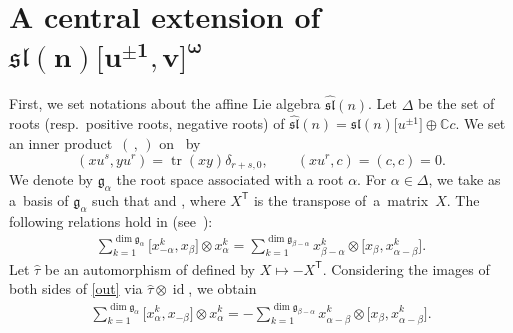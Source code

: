 \documentclass[pdftex]{sigma}
\numberwithin{equation}{section}
\theoremstyle{definition}
\DeclareMathOperator{\id}{id}
\DeclareMathOperator{\tr}{tr}
\begin{document}
\section[A central extension of sl(n){[u\^{}\{pm1\},v]}\^{}omega]{A central extension of $\boldsymbol{\mathfrak{sl}(n)\bigl[u^{\pm1},v\bigr]^\omega}$}\label{sec:3}
First, we set notations about the affine Lie algebra $\widehat{\mathfrak{sl}}(n)$.
Let $\Delta$  be the set of roots (resp.\ positive roots, negative roots) of $\widehat{\mathfrak{sl}}(n)=\mathfrak{sl}(n)\bigl[u^{\pm1}\bigr]\oplus\mathbb{C}c$.
We set an inner product~$(\, ,\, )$ on~ by
\begin{equation*}
(xu^s,yu^r)=\tr(xy)\delta_{r+s,0},\qquad (xu^r,c)=(c,c)=0.
\end{equation*}
We denote by $\mathfrak{g}_\alpha$ the root space associated with a root $\alpha$.
For $\alpha\in\Delta$, we take  as a~basis of $\mathfrak{g}_\alpha$ such that  and , where $X^{\mathsf{T}}$ is the transpose of~a~matrix~$X$.
The following relations hold in  (see~\cite[Corollary 2.4]{K}):
\begin{gather}
\sum_{k=1}^{\dim \mathfrak{g}_\alpha}\bigl[x_{-\alpha}^k,x_\beta\bigr]\otimes x_\alpha^k=\sum_{k=1}^{\dim \mathfrak{g}_{\beta-\alpha}}x_{\beta-\alpha}^k\otimes \bigl[x_\beta,x_{\alpha-\beta}^k\bigr].\label{out}
\end{gather}
Let $\widehat{\tau}$ be an automorphism of  defined by $X\mapsto-X^{\mathsf{T}}$. Considering the images of both sides of \eqref{out} via $\widehat{\tau}\otimes\id$, we obtain
\begin{gather}
\sum_{k=1}^{\dim \mathfrak{g}_\alpha}\bigl[x_{\alpha}^k,x_{-\beta}\bigr]\otimes x_\alpha^k=-\sum_{k=1}^{\dim \mathfrak{g}_{\beta-\alpha}}x_{\alpha-\beta}^k\otimes \bigl[x_\beta,x_{\alpha-\beta}^k\bigr].\label{out1}
\end{gather}
\end{document}

